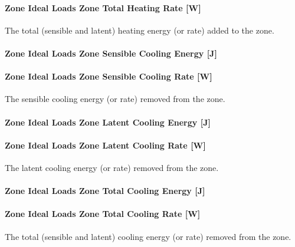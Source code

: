\paragraph{Zone Ideal Loads Zone Total Heating Rate {[}W{]}}\label{zone-ideal-loads-zone-total-heating-rate-w}

The total (sensible and latent) heating energy (or rate) added to the zone.

\paragraph{Zone Ideal Loads Zone Sensible Cooling Energy {[}J{]}}\label{zone-ideal-loads-zone-sensible-cooling-energy-j}

\paragraph{Zone Ideal Loads Zone Sensible Cooling Rate {[}W{]}}\label{zone-ideal-loads-zone-sensible-cooling-rate-w}

The sensible cooling energy (or rate) removed from the zone.

\paragraph{Zone Ideal Loads Zone Latent Cooling Energy {[}J{]}}\label{zone-ideal-loads-zone-latent-cooling-energy-j}

\paragraph{Zone Ideal Loads Zone Latent Cooling Rate {[}W{]}}\label{zone-ideal-loads-zone-latent-cooling-rate-w}

The latent cooling energy (or rate) removed from the zone.

\paragraph{Zone Ideal Loads Zone Total Cooling Energy {[}J{]}}\label{zone-ideal-loads-zone-total-cooling-energy-j}

\paragraph{Zone Ideal Loads Zone Total Cooling Rate {[}W{]}}\label{zone-ideal-loads-zone-total-cooling-rate-w}

The total (sensible and latent) cooling energy (or rate) removed from the zone.

